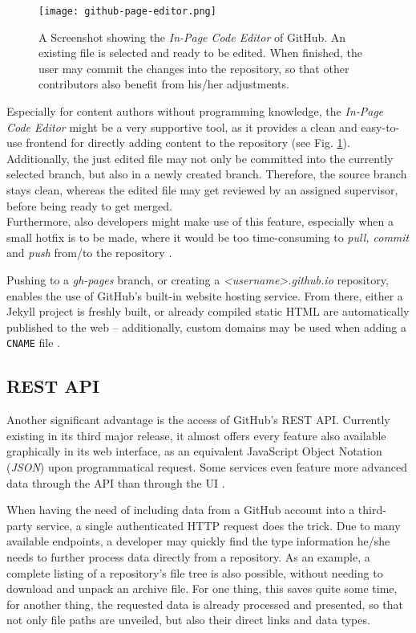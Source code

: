 \begin{figure} %
    \centering
    \texttt{[image: github-page-editor.png]}
    \caption{A Screenshot showing the \emph{In-Page Code Editor} of GitHub. An existing file is selected and ready to be edited. When finished, the user may commit the changes into the repository, so that other contributors also benefit from his/her adjustments.}
    \label{fig:github-page-editor}
\end{figure}
%

Especially for content authors without programming knowledge, the \emph{In-Page Code Editor} might be a very supportive tool, as it provides a clean and easy-to-use frontend for directly adding content to the repository (see Fig. \ref{fig:github-page-editor}). Additionally, the just edited file may not only be committed into the currently selected branch, but also in a newly created branch. Therefore, the source branch stays clean, whereas the edited file may get reviewed by an assigned supervisor, before being ready to get merged.\\
Furthermore, also developers might make use of this feature, especially when a small hotfix is to be made, where it would be too time-consuming to \emph{pull, commit} and \emph{push} from/to the repository \cite[405]{loeliger2012version}.

Pushing to a \emph{gh-pages} branch, or creating a \emph{<username>.github.io} repository, enables the use of GitHub's built-in website hosting service. From there, either a Jekyll project is freshly built, or already compiled static HTML are automatically published to the web -- additionally, custom domains may be used when adding a \texttt{CNAME} file \cite[p. 171f]{dhillon2016}.

\subsection{REST API}
Another significant advantage is the access of GitHub's REST API. Currently existing in its third major release, it almost offers every feature also available graphically in its web interface, as an equivalent JavaScript Object Notation (\emph{JSON}) upon programmatical request. Some services even feature more advanced data through the API than through the UI \cite[410]{loeliger2012version}.

When having the need of including data from a GitHub account into a third-party service, a single authenticated HTTP request does the trick. Due to many available endpoints, a developer may quickly find the type information he/she needs to further process data directly from a repository. As an example, a complete listing of a repository's file tree is also possible, without needing to download and unpack an archive file. For one thing, this saves quite some time, for another thing, the requested data is already processed and presented, so that not only file paths are unveiled, but also their direct links and data types.

